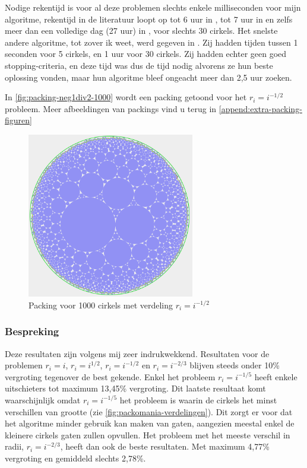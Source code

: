 \documentclass[12pt,a4paper,oneside]{book}
\begin{document}
Nodige rekentijd is voor al deze problemen slechts enkele milliseconden voor mijn algoritme, rekentijd in de literatuur loopt op tot 6 uur in \cite{jors2011}, tot 7 uur in \cite{lopez2013packing} en zelfs meer dan een volledige dag (27 uur) in \cite{zeng2016iterated}, voor slechts 30 cirkels.
Het snelste andere algoritme, tot zover ik weet, werd gegeven in \cite{ye2013iterated}.
Zij hadden tijden tussen 1 seconden voor 5 cirkels, en 1 uur voor 30 cirkels.
Zij hadden echter geen goed stopping-criteria, en deze tijd was dus de tijd nodig alvorens ze hun beste oplossing vonden, maar hun algoritme bleef ongeacht meer dan 2,5 uur zoeken.

In \autoref{fig:packing-neg1div2-1000} wordt een packing getoond voor het $r_i = i^{-1/2}$ probleem.
Meer afbeeldingen van packings vind u terug in \autoref{append:extra-packing-figuren}

\begin{figure}
  \centering
  \includegraphics[width=0.65\textwidth]{packing-neg1div2-1000.png}
  \caption{Packing voor 1000 cirkels met verdeling $r_i=i^{-1/2}$} \label{fig:packing-neg1div2-1000} 
\end{figure}

\subsubsection{Bespreking}

Deze resultaten zijn volgens mij zeer indrukwekkend.
Resultaten voor de problemen $r_i = i$, $r_i = i^{1/2}$, $r_i = i^{-1/2}$ en $r_i = i^{-2/3}$ blijven steeds onder 10\% vergroting tegenover de best gekende.
Enkel het probleem $r_i = i^{-1/5}$ heeft enkele uitschieters tot maximum 13,45\% vergroting.
Dit laatste resultaat komt waarschijnlijk omdat $r_i = i^{-1/5}$ het probleem is waarin de cirkels het minst verschillen van grootte (zie \autoref{fig:packomania-verdelingen}).
Dit zorgt er voor dat het algoritme minder gebruik kan maken van gaten, aangezien meestal enkel de kleinere cirkels gaten zullen opvullen.
Het probleem met het meeste verschil in radii, $r_i = i^{-2/3}$, heeft dan ook de beste resultaten.
Met maximum 4,77\% vergroting en gemiddeld slechts 2,78\%.
\end{document}
